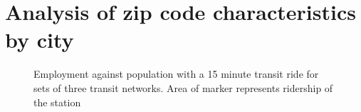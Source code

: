\documentclass[11pt]{report}
\begin{document}
\section{Analysis of zip code characteristics by city}
\begin{figure}
\centering
{}

\vspace{-15pt}
\captionsetup{singlelinecheck=off, justification=centering}
\caption[]{Employment against population with a 15 minute transit ride for sets of three transit networks.\linebreak
Area of marker represents ridership of the station}\label{fig:localvars}
\end{figure}
\end{document}
